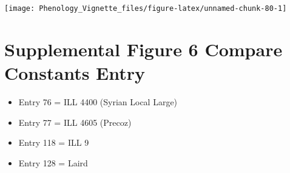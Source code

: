 \documentclass[
]{article}
\providecommand{\tightlist}{%
  \setlength{\itemsep}{0pt}\setlength{\parskip}{0pt}}
\begin{document}
\texttt{[image: Phenology\_Vignette\_files/figure-latex/unnamed-chunk-80-1]}

\hypertarget{supplemental-figure-6-compare-constants-entry}{%
\section{Supplemental Figure 6 Compare Constants
Entry}\label{supplemental-figure-6-compare-constants-entry}}

\begin{itemize}
\tightlist
\item
  Entry 76 = ILL 4400 (Syrian Local Large)
\item
  Entry 77 = ILL 4605 (Precoz)
\item
  Entry 118 = ILL 9
\item
  Entry 128 = Laird
\end{itemize}
\end{document}
